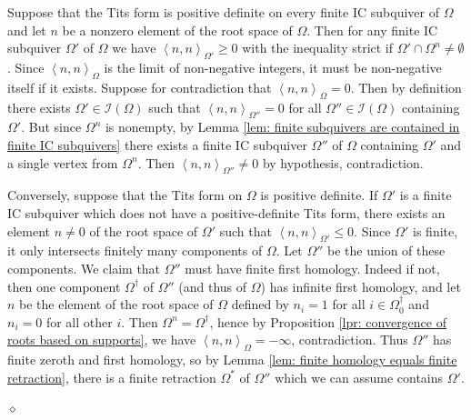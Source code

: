 \documentclass{article}
\newcommand{\bracket}[1]{\left \langle #1 \right\rangle}
\newenvironment{proof}{\vspace*{2ex}\noindent {\em Proof:}
}{\hfill $\diamond$ \\[2ex]}
\newcommand{\hilight}[1]{\colorbox{yellow}{#1}}
\begin{document}
\begin{proof}
Suppose that the Tits form is positive definite on every finite IC subquiver of $\Omega$ and let $n$ be a nonzero element of the root space of $\Omega$. Then for any finite IC subquiver $\Omega'$ of $\Omega$ we have $\bracket{n , n}_{\Omega'} \geq 0$ with the inequality strict if $\Omega' \cap \Omega^n \neq \emptyset$. Since $\bracket{n , n}_\Omega$ is the limit of non-negative integers, it must be non-negative itself if it exists. Suppose for contradiction that $\bracket{n , n}_\Omega = 0$. Then by definition there exists $\Omega' \in \mathcal{I}(\Omega)$ such that $\bracket{n , n}_{\Omega''} = 0$ for all $\Omega'' \in \mathcal{I}(\Omega)$ containing $\Omega'$. But since $\Omega^n$ is nonempty, by Lemma \ref{lem: finite subquivers are contained in finite IC subquivers} there exists a finite IC subquiver $\Omega''$ of $\Omega$ containing $\Omega'$ and a single vertex from $\Omega^n$. Then $\bracket{n , n}_{\Omega''} \neq 0$ by hypothesis, contradiction.

Conversely, suppose that the Tits form on $\Omega$ is positive definite. If $\Omega'$ is a finite IC subquiver which does not have a positive-definite Tits form, there exists an element $n \neq 0$ of the root space of $\Omega'$ such that $\bracket{n , n}_{\Omega'} \leq 0$. Since $\Omega'$ is finite, it only intersects finitely many components of $\Omega$. Let $\Omega''$ be the union of these components. We claim that $\Omega''$ must have finite first homology. Indeed if not, then one component $\Omega^\dagger$ of $\Omega''$ (and thus of $\Omega$) has infinite first homology, and let $n$ be the element of the root space of $\Omega$ defined by $n_i = 1$ for all $i \in \Omega^\dagger_0$ and $n_i = 0$ for all other $i$. Then $\Omega^n = \Omega^\dagger$, hence by Proposition \ref{lpr: convergence of roots based on supports}, we have $\bracket{n , n}_\Omega = -\infty$, contradiction. Thus $\Omega''$ has finite zeroth and first homology, so by Lemma \ref{lem: finite homology equals finite retraction}, there is a finite retraction $\Omega^*$ of $\Omega''$ which we can assume contains $\Omega'$.



\end{proof}
\end{document}
